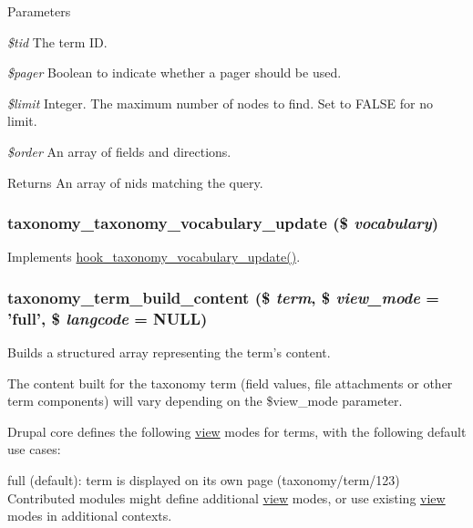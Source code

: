\begin{DoxyParams}{Parameters}
\item[{\em \$tid}]The term ID. \item[{\em \$pager}]Boolean to indicate whether a pager should be used. \item[{\em \$limit}]Integer. The maximum number of nodes to find. Set to FALSE for no limit. \item[{\em \$order}]An array of fields and directions.\end{DoxyParams}
\begin{DoxyReturn}{Returns}
An array of nids matching the query. 
\end{DoxyReturn}
\hypertarget{taxonomy_8module_a14da957ce3f1c09dbccea6d2c164f81c}{
\subsubsection[{taxonomy\_\-taxonomy\_\-vocabulary\_\-update}]{\setlength{\rightskip}{0pt plus 5cm}taxonomy\_\-taxonomy\_\-vocabulary\_\-update (\$ {\em vocabulary})}}
\label{taxonomy_8module_a14da957ce3f1c09dbccea6d2c164f81c}
Implements \hyperlink{group__hooks_gaf7e614327d1d3826d208fd6528df4a70}{hook\_\-taxonomy\_\-vocabulary\_\-update()}. \hypertarget{taxonomy_8module_a7acf51937f2dbe503ca3d9d317225066}{
\subsubsection[{taxonomy\_\-term\_\-build\_\-content}]{\setlength{\rightskip}{0pt plus 5cm}taxonomy\_\-term\_\-build\_\-content (\$ {\em term}, \/  \$ {\em view\_\-mode} = {\ttfamily 'full'}, \/  \$ {\em langcode} = {\ttfamily NULL})}}
\label{taxonomy_8module_a7acf51937f2dbe503ca3d9d317225066}
Builds a structured array representing the term's content.

The content built for the taxonomy term (field values, file attachments or other term components) will vary depending on the \$view\_\-mode parameter.

Drupal core defines the following \hyperlink{classview}{view} modes for terms, with the following default use cases:
\begin{DoxyItemize}
\item full (default): term is displayed on its own page (taxonomy/term/123) Contributed modules might define additional \hyperlink{classview}{view} modes, or use existing \hyperlink{classview}{view} modes in additional contexts.
\end{DoxyItemize}


